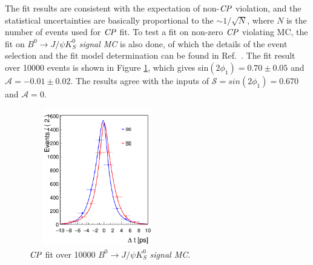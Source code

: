 The fit results are consistent with the expectation of non-$\it{CP}$ violation, and the statistical uncertainties are basically proportional to the $\sim 1/\sqrt{N}$, where $N$ is the number of events used for $\it{CP}$ fit. To test a fit on non-zero $\it{CP}$ violating MC, the fit on $B^0\to J/\psi K_S^0$ \textit{signal MC} is also done, of which the details of the event selection and the fit model determination can be found in Ref.~\cite{jpsiks_ichep}. The fit result over 10000 events is shown in Figure \ref{fig:cpfit_jpsiks}, which gives sin$(2\phi_1) = 0.70 \pm 0.05 $ and $\mathcal{A} = -0.01\pm 0.02$. The results agree with the inputs of $\mathcal{S}=sin(2\phi_1)=0.670$ and $\mathcal{A}=0$.
\begin{figure}[htpb]
	\centering
	\includegraphics[width=6cm, height=6cm]{figures/jpsiks_cpfit10000}
	\caption{$\it{CP}$ fit over 10000 $B^0\to J/\psi K_S^0$ \textit{signal MC}.}
	\label{fig:cpfit_jpsiks}
\end{figure}


